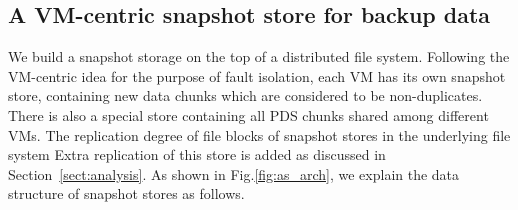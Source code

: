 



\subsection{A VM-centric snapshot store for backup data}

We build a snapshot storage on the top of a distributed file system.
Following the VM-centric idea for the purpose of fault isolation,
each VM has its own snapshot store, containing new data chunks which are considered
to be non-duplicates.
There is also a special store containing all PDS chunks shared among different VMs.
The replication degree of file blocks of snapshot stores in the underlying file system
Extra replication of this store is added as discussed in Section~\ref{sect:analysis}.
As shown in Fig.\ref{fig:as_arch}, we explain the data structure of snapshot stores as follows.

